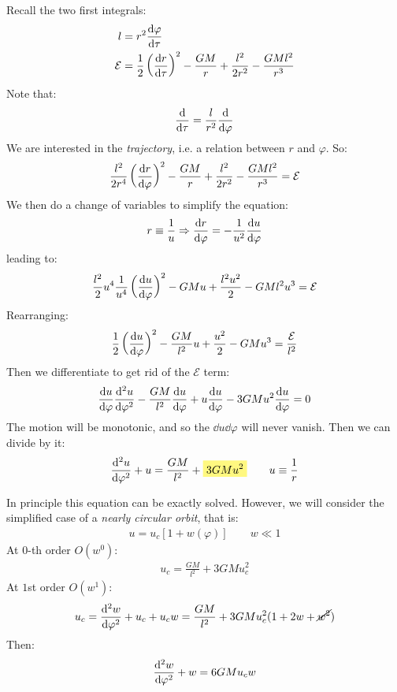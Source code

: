 \documentclass[../template.tex]{subfiles}
\begin{document}
Recall the two first integrals:
\begin{align*}
    l &= r^2 \dv{\varphi}{\tau}\\
    \mathcal{E}&=\frac{1}{2} \left(\dv{r}{\tau}\right) ^2 - \frac{GM}{r} + \frac{l^2}{2r^2} - \frac{GMl^2}{r^3}
\end{align*}
Note that:
\begin{align*}
    \dv{\tau} = \frac{l}{r^2} \dv{\varphi} 
\end{align*}
We are interested in the \textit{trajectory}, i.e. a relation between $r$ and $\varphi$. So:
\begin{align*}
    \frac{l^2}{2 r^4} \left(\dv{r}{\varphi}\right) ^2 - \frac{GM}{r} + \frac{l^2}{2r^2} - \frac{GMl^2}{r^3} = \mathcal{E}   
\end{align*}   
We then do a change of variables to simplify the equation:
\begin{align*}
    r \equiv \frac{1}{u} \Rightarrow \dv{r}{\varphi} = -\frac{1}{u^2} \dv{u}{\varphi}   
\end{align*}
leading to:
\begin{align*}
    \frac{l^2}{2} u^4 \frac{1}{u^4} \left(\dv{u}{\varphi}\right)  ^2 - GM u + \frac{l^2 u^2}{2} - GMl^2 u^3 = \mathcal{E} 
\end{align*}
Rearranging:
\begin{align*}
   \frac{1}{2}  \left(\dv{u}{\varphi}\right)^2 - \frac{GM}{l^2} u + \frac{u^2}{2}-  GMu^3 = \frac{\mathcal{E}}{l^2}  
\end{align*}
Then we differentiate to get rid of the $\mathcal{E}$ term:
\begin{align*}
    \dv{u}{\varphi} \dv[2]{u}{\varphi} - \frac{GM}{l^2} \dv{u}{\varphi} + u \dv{u}{\varphi} - 3 GM u^2 \dv{u}{\varphi} = 0 
\end{align*}
The motion will be monotonic, and so the $\dd{u}\dd{\varphi}$ will never vanish. Then we can divide by it:
\begin{align*}
    \dv[2]{u}{\varphi} + u = \frac{GM}{l^2} + \hlc{Yellow}{3 GM u^2}  \qquad u\equiv \frac{1}{r} 
\end{align*}

In principle this equation can be exactly solved. However, we will consider the simplified case of a \textit{nearly circular orbit}, that is:
\begin{align*}
    u = u_c [1 + w(\varphi)] \qquad w \ll 1
\end{align*} 
At $0$-th order $O(w^0)$:
\begin{align*}
    u_c = \frac{GM}{l^2} + 3GM u_c^2
\end{align*} 
At $1$st order $O(w^1)$:
\begin{align*}
    u_c = \dv[2]{w}{\varphi} + u_c + u_c w = \frac{GM}{l^2} + 3 GM u_c^2 (1+ 2 w + \cancel{w^2}) 
\end{align*}  
Then:
\begin{align*}
    \dv[2]{w}{\varphi} + w = 6GM u_c w
\end{align*}


       
\end{document}
